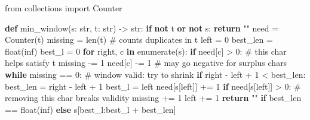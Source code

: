 \documentclass[11pt]{article}
\newenvironment{Shaded}{\begin{snugshade}}{\end{snugshade}}
\newcommand{\BuiltInTok}[1]{\textcolor[rgb]{0.50,0.55,0.55}{#1}}
\newcommand{\CommentTok}[1]{\textcolor[rgb]{0.48,0.49,0.49}{#1}}
\newcommand{\ControlFlowTok}[1]{\textcolor[rgb]{0.99,0.74,0.29}{\textbf{#1}}}
\newcommand{\DecValTok}[1]{\textcolor[rgb]{0.96,0.45,0.00}{#1}}
\newcommand{\ImportTok}[1]{\textcolor[rgb]{0.15,0.68,0.38}{#1}}
\newcommand{\KeywordTok}[1]{\textcolor[rgb]{0.81,0.81,0.76}{\textbf{#1}}}
\newcommand{\NormalTok}[1]{\textcolor[rgb]{0.81,0.81,0.76}{#1}}
\newcommand{\OperatorTok}[1]{\textcolor[rgb]{0.81,0.81,0.76}{#1}}
\newcommand{\StringTok}[1]{\textcolor[rgb]{0.96,0.31,0.31}{#1}}
\begin{document}
\begin{Shaded}
\begin{Highlighting}[]
\ImportTok{from}\NormalTok{ collections }\ImportTok{import}\NormalTok{ Counter}

\KeywordTok{def}\NormalTok{ min\_window(s: }\BuiltInTok{str}\NormalTok{, t: }\BuiltInTok{str}\NormalTok{) }\OperatorTok{{-}\textgreater{}} \BuiltInTok{str}\NormalTok{:}
    \ControlFlowTok{if} \KeywordTok{not}\NormalTok{ t }\KeywordTok{or} \KeywordTok{not}\NormalTok{ s:}
        \ControlFlowTok{return} \StringTok{""}
\NormalTok{    need }\OperatorTok{=}\NormalTok{ Counter(t)}
\NormalTok{    missing }\OperatorTok{=} \BuiltInTok{len}\NormalTok{(t)               }\CommentTok{\# counts duplicates in t}
\NormalTok{    left }\OperatorTok{=} \DecValTok{0}
\NormalTok{    best\_len }\OperatorTok{=} \BuiltInTok{float}\NormalTok{(}\StringTok{\textquotesingle{}inf\textquotesingle{}}\NormalTok{)}
\NormalTok{    best\_l }\OperatorTok{=} \DecValTok{0}
    \ControlFlowTok{for}\NormalTok{ right, c }\KeywordTok{in} \BuiltInTok{enumerate}\NormalTok{(s):}
        \ControlFlowTok{if}\NormalTok{ need[c] }\OperatorTok{\textgreater{}} \DecValTok{0}\NormalTok{:            }\CommentTok{\# this char helps satisfy t}
\NormalTok{            missing }\OperatorTok{{-}=} \DecValTok{1}
\NormalTok{        need[c] }\OperatorTok{{-}=} \DecValTok{1}               \CommentTok{\# may go negative for surplus chars}
        \ControlFlowTok{while}\NormalTok{ missing }\OperatorTok{==} \DecValTok{0}\NormalTok{:        }\CommentTok{\# window valid: try to shrink}
            \ControlFlowTok{if}\NormalTok{ right }\OperatorTok{{-}}\NormalTok{ left }\OperatorTok{+} \DecValTok{1} \OperatorTok{\textless{}}\NormalTok{ best\_len:}
\NormalTok{                best\_len }\OperatorTok{=}\NormalTok{ right }\OperatorTok{{-}}\NormalTok{ left }\OperatorTok{+} \DecValTok{1}
\NormalTok{                best\_l }\OperatorTok{=}\NormalTok{ left}
\NormalTok{            need[s[left]] }\OperatorTok{+=} \DecValTok{1}
            \ControlFlowTok{if}\NormalTok{ need[s[left]] }\OperatorTok{\textgreater{}} \DecValTok{0}\NormalTok{:  }\CommentTok{\# removing this char breaks validity}
\NormalTok{                missing }\OperatorTok{+=} \DecValTok{1}
\NormalTok{            left }\OperatorTok{+=} \DecValTok{1}
    \ControlFlowTok{return} \StringTok{""} \ControlFlowTok{if}\NormalTok{ best\_len }\OperatorTok{==} \BuiltInTok{float}\NormalTok{(}\StringTok{\textquotesingle{}inf\textquotesingle{}}\NormalTok{) }\ControlFlowTok{else}\NormalTok{ s[best\_l:best\_l }\OperatorTok{+}\NormalTok{ best\_len]}
\end{Highlighting}
\end{Shaded}
\end{document}
